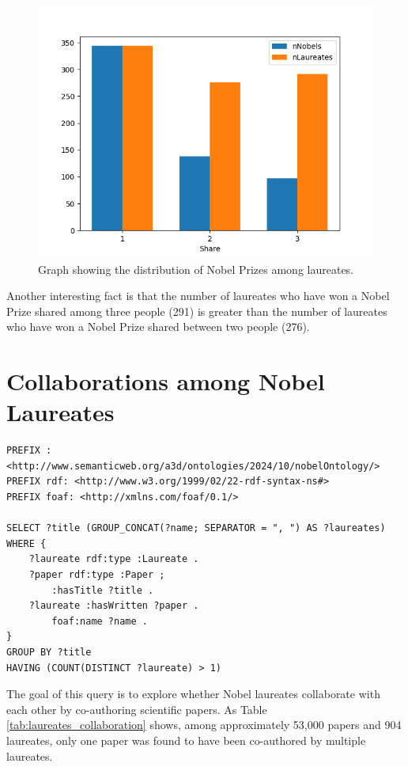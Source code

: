 \documentclass{article}
\begin{document}
\begin{figure}[H]
	\centering
	\includegraphics[width=0.7\linewidth]{../queries/plots/nobelShare.png}
	\caption{Graph showing the distribution of Nobel Prizes among laureates.}
	\label{fig:prizeShare}
\end{figure}

Another interesting fact is that the number of laureates who have won a Nobel Prize shared among three people (291)
is greater than the number of laureates who have won a Nobel Prize shared between two people (276).

\section{Collaborations among Nobel Laureates}

\begin{lstlisting}
PREFIX : <http://www.semanticweb.org/a3d/ontologies/2024/10/nobelOntology/>
PREFIX rdf: <http://www.w3.org/1999/02/22-rdf-syntax-ns#>
PREFIX foaf: <http://xmlns.com/foaf/0.1/>

SELECT ?title (GROUP_CONCAT(?name; SEPARATOR = ", ") AS ?laureates) WHERE {
    ?laureate rdf:type :Laureate .
    ?paper rdf:type :Paper ;
        :hasTitle ?title .
    ?laureate :hasWritten ?paper .
        foaf:name ?name .
}
GROUP BY ?title
HAVING (COUNT(DISTINCT ?laureate) > 1)
\end{lstlisting}

\vspace{1em}

The goal of this query is to explore whether Nobel laureates collaborate with each other by co-authoring
scientific papers. As Table \ref{tab:laureates_collaboration} shows, among approximately 53,000 papers
and 904 laureates, only one paper was found to have been co-authored by multiple laureates.
\end{document}
